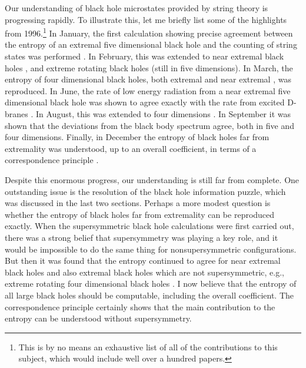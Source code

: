 
Our understanding of black hole microstates provided by string theory is
progressing rapidly. To illustrate this, let me briefly list 
some of the highlights from 1996.\footnote{This is by no means an
exhaustive list of all of the contributions to this subject, which would
include well over a hundred papers.} In January, the first
calculation showing precise agreement between the entropy of an extremal
five dimensional black hole and the counting of string states was performed
\cite{stva}.
In February, this was extended to near extremal black holes \cite{cama,host2},
and extreme
rotating black holes \cite{bmpv} (still in five dimensions). In March, the
entropy of four dimensional black holes, both extremal \cite{mast1,jkm}
and near extremal \cite{hlm},
was reproduced. In June, the rate of low energy radiation from
a near extremal five dimensional black hole was shown  to agree exactly
with the rate from excited D-branes \cite{dama}. 
In August, this was extended to four 
dimensions \cite{gukl2}.
In September it was shown that the deviations from the black body
spectrum agree, both in five \cite{mast2} and four \cite{gukl} dimensions.
Finally, in December the entropy of black holes far from
extremality was understood, up to an overall coefficient, in terms of
a correspondence principle \cite{hopo}. 

Despite this enormous progress, our understanding is still far from 
complete. One outstanding issue is the resolution of the black hole
information puzzle, which was discussed in the last two sections. 
Perhaps a more modest question is
whether the entropy of black holes
far from extremality can be reproduced exactly. When the supersymmetric 
black hole calculations were first carried out, there was a strong
belief that supersymmetry was playing a key role, and it would
be impossible to do the same thing for nonsupersymmetric configurations.
But then it was found that the entropy continued to 
agree for near extremal black holes and also extremal black
holes which are not supersymmetric, e.g., extreme
rotating four dimensional black holes \cite{hlm,dab}. I now believe that the 
entropy of all large black holes should be computable, including the
overall coefficient.
The
correspondence principle certainly
shows that the main contribution to the entropy
can be understood without supersymmetry.

